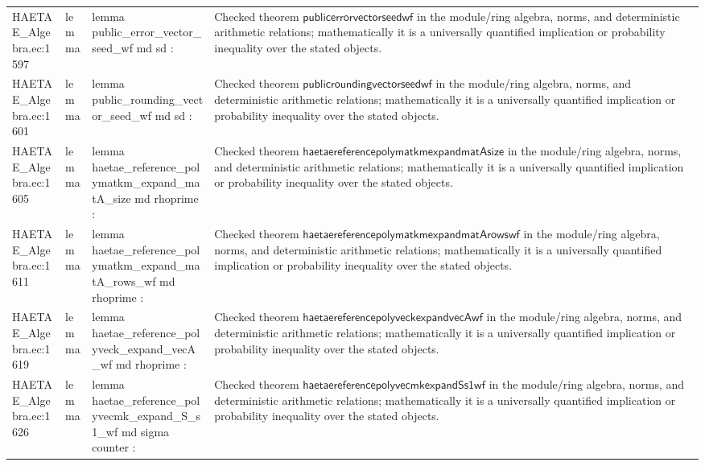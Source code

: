 \documentclass[10pt]{article}
\begin{document}
\begin{longtable}{L{0.11\textwidth}L{0.055\textwidth}L{0.385\textwidth}L{0.41\textwidth}}
HAETAE\_\allowbreak{}Algebra.\allowbreak{}ec:\allowbreak{}1597 & lemma & {\ttfamily\scriptsize lemma public\_\allowbreak{}error\_\allowbreak{}vector\_\allowbreak{}seed\_\allowbreak{}wf md sd :} & Checked theorem $\mathsf{publicerrorvectorseedwf}$ in the module/ring algebra, norms, and deterministic arithmetic relations; mathematically it is a universally quantified implication or probability inequality over the stated objects. \\
HAETAE\_\allowbreak{}Algebra.\allowbreak{}ec:\allowbreak{}1601 & lemma & {\ttfamily\scriptsize lemma public\_\allowbreak{}rounding\_\allowbreak{}vector\_\allowbreak{}seed\_\allowbreak{}wf md sd :} & Checked theorem $\mathsf{publicroundingvectorseedwf}$ in the module/ring algebra, norms, and deterministic arithmetic relations; mathematically it is a universally quantified implication or probability inequality over the stated objects. \\
HAETAE\_\allowbreak{}Algebra.\allowbreak{}ec:\allowbreak{}1605 & lemma & {\ttfamily\scriptsize lemma haetae\_\allowbreak{}reference\_\allowbreak{}polymatkm\_\allowbreak{}expand\_\allowbreak{}matA\_\allowbreak{}size md rhoprime :} & Checked theorem $\mathsf{haetaereferencepolymatkmexpandmatAsize}$ in the module/ring algebra, norms, and deterministic arithmetic relations; mathematically it is a universally quantified implication or probability inequality over the stated objects. \\
HAETAE\_\allowbreak{}Algebra.\allowbreak{}ec:\allowbreak{}1611 & lemma & {\ttfamily\scriptsize lemma haetae\_\allowbreak{}reference\_\allowbreak{}polymatkm\_\allowbreak{}expand\_\allowbreak{}matA\_\allowbreak{}rows\_\allowbreak{}wf md rhoprime :} & Checked theorem $\mathsf{haetaereferencepolymatkmexpandmatArowswf}$ in the module/ring algebra, norms, and deterministic arithmetic relations; mathematically it is a universally quantified implication or probability inequality over the stated objects. \\
HAETAE\_\allowbreak{}Algebra.\allowbreak{}ec:\allowbreak{}1619 & lemma & {\ttfamily\scriptsize lemma haetae\_\allowbreak{}reference\_\allowbreak{}polyveck\_\allowbreak{}expand\_\allowbreak{}vecA\_\allowbreak{}wf md rhoprime :} & Checked theorem $\mathsf{haetaereferencepolyveckexpandvecAwf}$ in the module/ring algebra, norms, and deterministic arithmetic relations; mathematically it is a universally quantified implication or probability inequality over the stated objects. \\
HAETAE\_\allowbreak{}Algebra.\allowbreak{}ec:\allowbreak{}1626 & lemma & {\ttfamily\scriptsize lemma haetae\_\allowbreak{}reference\_\allowbreak{}polyvecmk\_\allowbreak{}expand\_\allowbreak{}S\_\allowbreak{}s1\_\allowbreak{}wf md sigma counter :} & Checked theorem $\mathsf{haetaereferencepolyvecmkexpandSs1wf}$ in the module/ring algebra, norms, and deterministic arithmetic relations; mathematically it is a universally quantified implication or probability inequality over the stated objects. \\

\end{longtable}
\end{document}
